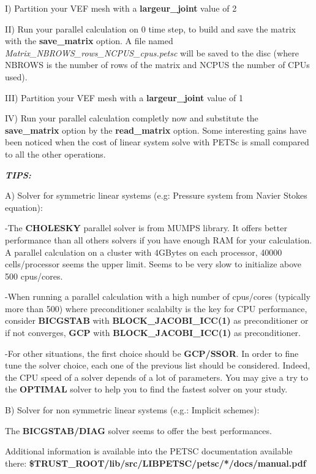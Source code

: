 I) Partition your VEF mesh with a \textbf{largeur\_joint }value of 2

II) Run your parallel calculation on 0 time step, to build and save the matrix with the \textbf{save\_matrix} option. A
file named \textit{Matrix\_NBROWS\_rows\_NCPUS\_cpus.petsc} will be saved to the disc (where NBROWS is the number of
rows of the matrix and NCPUS the number of CPUs used). 

III) Partition your VEF mesh with a \textbf{largeur\_joint} value of 1

IV) Run your parallel calculation completly now and substitute the \textbf{save\_matrix} option by the
\textbf{read\_matrix} option. Some interesting gains have been noticed when the cost of linear system solve with PETSc
is small compared to all the other operations. 


\bigskip


\bigskip

{\bfseries\itshape
TIPS:}

A) Solver for symmetric linear systems (e.g: Pressure system from Navier Stokes equation):

{}-The \textbf{CHOLESKY} parallel solver is from MUMPS library. It offers better performance than all others solvers if
you have enough RAM for your calculation. A parallel calculation on a cluster with 4GBytes on each processor, 40000
cells/processor seems the upper limit. Seems to be very slow to initialize above 500 cpus/cores.


\bigskip

{}-When running a parallel calculation with a high number of cpus/cores (typically more than 500) where preconditioner
scalabilty is the key for CPU performance, consider \textbf{BICGSTAB }with \textbf{BLOCK\_JACOBI\_ICC(1)} as
preconditioner or if not converges, \textbf{GCP}\textbf{ }with\textbf{ BLOCK\_JACOBI\_ICC(1) }as
preconditioner.


\bigskip

{}-For other situations, the first choice should be \textbf{GCP}\textbf{/SSOR}. In order to fine
tune the solver choice, each one of the previous list should be considered. Indeed, the CPU speed of a solver depends
of a lot of parameters. You may give a try to the \textbf{OPTIMAL} solver to help you to find the fastest solver on
your study. 


\bigskip

B) Solver for non symmetric linear systems (e.g.: Implicit schemes):

The \textbf{BICGSTAB/DIAG }solver seems to offer the best performances.


\bigskip

Additional information is available into the PETSC documentation available there:
\textbf{\$TRUST\_ROOT/lib/src/LIBPETSC/petsc/*/docs/manual.pdf}
